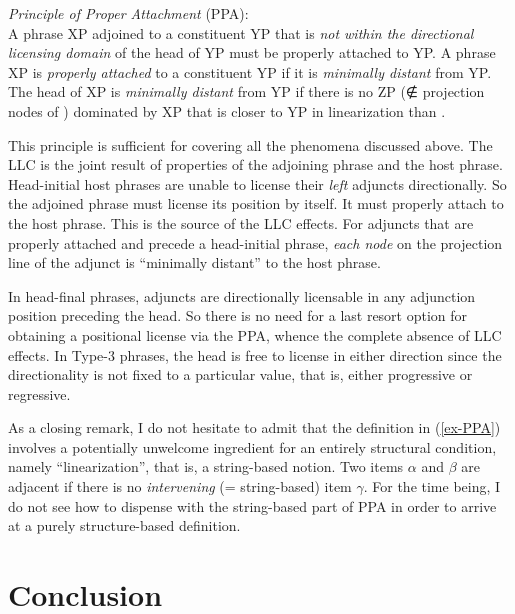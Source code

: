 \documentclass[output=paper
  ,nobabel
  ,uniformtopskip %
]{langscibook}
\begin{document}
\ealnoraggedright\label{ex-PPA}
\ex \emph{Principle of Proper Attachment }(PPA): \\ A phrase XP adjoined to a constituent YP that is \emph{not within the directional licensing domain} of the head of YP must be properly attached to YP.
\ex A phrase XP is \emph{properly attached} to a constituent YP if it is \emph{minimally distant} from YP.
\ex The head \xzero of XP is \emph{minimally distant} from YP if there is no ZP (∉ projection nodes of \xzero) dominated by XP that is closer to YP in linearization than \xzero.
\zl

\noindent
This principle is sufficient for covering all the phenomena discussed above. The LLC is the joint result of properties of the adjoining phrase and the host phrase. Head-initial host phrases are unable to license their \emph{left} adjuncts directionally. So the adjoined phrase must license its position by itself. It must properly attach to the host phrase. This is the source of the LLC effects. For adjuncts that are properly attached and precede a head-initial phrase, \emph{each node} on the projection line of the adjunct is ``minimally distant'' to the host phrase.

In head-final phrases, adjuncts are directionally licensable in any adjunction position preceding the head. So there is no need for a last resort option for obtaining a positional license via the PPA, whence the complete absence of LLC effects. In Type-3 phrases, the head is free to license in either direction since the directionality is not fixed to a particular value, that is, either progressive or regressive.

As a closing remark, I do not hesitate to admit that the definition in (\ref{ex-PPA}) involves a potentially unwelcome ingredient for an entirely structural condition, namely ``linearization'', that is, a string-based notion. Two items $\alpha$ and $\beta$ are adjacent if there is no \emph{intervening} (= string-based) item $\gamma$. For the time being, I do not see how to dispense with the string-based part of PPA in order to arrive at a purely structure-based definition.

\section{Conclusion}\label{sec-con-hai}
\end{document}
